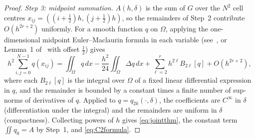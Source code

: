 \documentclass[11pt]{article}
\theoremstyle{remark}
\begin{document}
\begin{proof}
\emph{Step 3: midpoint summation.} $A(h,\delta)$ is the sum of $G$ over the $N^2$ cell centres
$x_{ij}=((i+\tfrac12)h,(j+\tfrac12)h)$, so the remainders of Step~2 contribute $O(h^{2r+2})$
uniformly. For a smooth function $q$ on $\Omega$, applying the one-dimensional midpoint
Euler--Maclaurin formula in each variable (see~\cite{davisrabinowitz}, or Lemma~1
of~\cite{verlindencools} with offset $\tfrac12$) gives
\[
h^2\sum_{i,j=0}^{N-1}q(x_{ij})=\iint_\Omega q\,dx-\frac{h^2}{24}\iint_\Omega\Delta q\,dx
+\sum_{\ell=2}^{r}h^{2\ell}B_{2\ell}[q]+O(h^{2r+2}),
\]
where each $B_{2\ell}[q]$ is the integral over $\Omega$ of a fixed linear differential
expression in $q$, and the remainder is bounded by a constant times a finite number of
sup-norms of derivatives of $q$. Applied to $q=q_{2k}(\cdot,\delta)$, the coefficients are
$C^\infty$ in $\delta$ (differentiation under the integral) and the remainders are uniform in
$\delta$ (compactness). Collecting powers of $h$ gives \eqref{eq:jointthm}, the constant term
$\iint q_0=A$ by Step~1, and \eqref{eq:C2formula}.
\end{proof}
\end{document}
